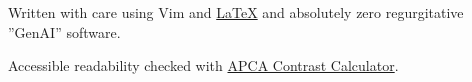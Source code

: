 \documentclass[lighthipster]{simplehipstercv}
\begin{document}
\begin{paracol}{2}



  \vfill{} %
  \vspace{6em}
  \vfill
  \begin{center}\fontfamily{\sfdefault}\selectfont \color{black!90}
    {
      \small
      Written with care using Vim and \href{https://github.com/izcet/latex-resume}{\LaTeX{}} and absolutely zero regurgitative ''GenAI'' software.

      Accessible readability checked with \href{http://www.myndex.com/APCA/}{APCA Contrast Calculator}.
    }
  \end{center}

  \vspace{2em}
\end{paracol}
\end{document}
